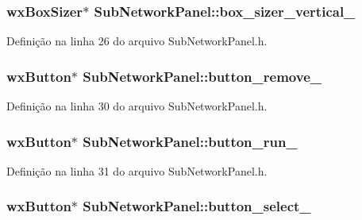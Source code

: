 \subsubsection[{box\+\_\+sizer\+\_\+vertical\+\_\+}]{\setlength{\rightskip}{0pt plus 5cm}wx\+Box\+Sizer$\ast$ Sub\+Network\+Panel\+::box\+\_\+sizer\+\_\+vertical\+\_\+\hspace{0.3cm}{\ttfamily [protected]}}\label{class_sub_network_panel_a50a62191f84f3086e988be6ecf64ee37}


Definição na linha 26 do arquivo Sub\+Network\+Panel.\+h.

\subsubsection[{button\+\_\+remove\+\_\+}]{\setlength{\rightskip}{0pt plus 5cm}wx\+Button$\ast$ Sub\+Network\+Panel\+::button\+\_\+remove\+\_\+\hspace{0.3cm}{\ttfamily [protected]}}\label{class_sub_network_panel_aafdb2eefa3825686d93dc3e5fbf762b2}


Definição na linha 30 do arquivo Sub\+Network\+Panel.\+h.

\subsubsection[{button\+\_\+run\+\_\+}]{\setlength{\rightskip}{0pt plus 5cm}wx\+Button$\ast$ Sub\+Network\+Panel\+::button\+\_\+run\+\_\+\hspace{0.3cm}{\ttfamily [protected]}}\label{class_sub_network_panel_a200b5f3c2872287c9f72c21deb1d8399}


Definição na linha 31 do arquivo Sub\+Network\+Panel.\+h.

\subsubsection[{button\+\_\+select\+\_\+}]{\setlength{\rightskip}{0pt plus 5cm}wx\+Button$\ast$ Sub\+Network\+Panel\+::button\+\_\+select\+\_\+\hspace{0.3cm}{\ttfamily [protected]}}\label{class_sub_network_panel_a4cf31b287723da1d33f504c065c780fb}



